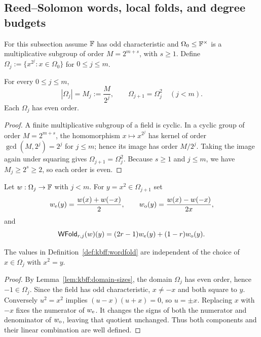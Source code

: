 \subsection{Reed--Solomon words, local folds, and degree budgets}\label{sec:kbfoldfold:codewords}

For this subsection assume $\mathbb{F}$ has odd characteristic and
$\Omega_0\leq\mathbb{F}^\times$ is a multiplicative subgroup of order $M=2^{m+s}$,
with $s\geq1$. Define $\Omega_j:=\{x^{2^j}:x\in\Omega_0\}$ for
$0\leq j\leq m$.

\begin{lemma}\label{lem:kbff:domain-sizes}
For every $0\leq j\leq m$,
\[
 |\Omega_j|=M_j:=\frac{M}{2^j},\qquad
 \Omega_{j+1}=\Omega_j^2\quad(j<m).
\]
Each $\Omega_j$ has even order.
\end{lemma}
\begin{proof}
A finite multiplicative subgroup of a field is cyclic. In a cyclic
group of order $M=2^{m+s}$, the homomorphism $x\mapsto x^{2^j}$ has
kernel of order $\gcd(M,2^j)=2^j$ for $j\leq m$; hence its image has order
$M/2^j$. Taking the image again under squaring gives
$\Omega_{j+1}=\Omega_j^2$. Because $s\geq1$ and $j\leq m$, we have
$M_j\geq2^s\geq2$, so each order is even.
\end{proof}

\begin{definition}\label{def:kbff:wordfold}
Let $w:\Omega_j\to\mathbb{F}$ with $j<m$. For $y=x^2\in\Omega_{j+1}$ set
\[
 w_{\rm e}(y)=\frac{w(x)+w(-x)}2,\qquad
 w_{\rm o}(y)=\frac{w(x)-w(-x)}{2x},
\]
and
\[
 \mathsf{WFold}_{r,j}(w)(y)
   =(2r-1)w_{\rm e}(y)+(1-r)w_{\rm o}(y).
\]
\end{definition}

\begin{lemma}\label{lem:kbff:wordfold-well-defined}
The values in Definition~\ref{def:kbff:wordfold} are independent of the choice
of $x\in\Omega_j$ with $x^2=y$.
\end{lemma}
\begin{proof}
By Lemma~\ref{lem:kbff:domain-sizes}, the domain $\Omega_j$ has even
order, hence $-1\in\Omega_j$. Since the field has odd characteristic,
$x\neq-x$ and both square to $y$.
Conversely $u^2=x^2$ implies $(u-x)(u+x)=0$, so $u=\pm x$.
Replacing $x$ with $-x$ fixes the numerator of $w_{\rm e}$.
It changes the signs of both the numerator and denominator of
$w_{\rm o}$, leaving that quotient unchanged. Thus both components and
their linear combination are well defined.
\end{proof}

